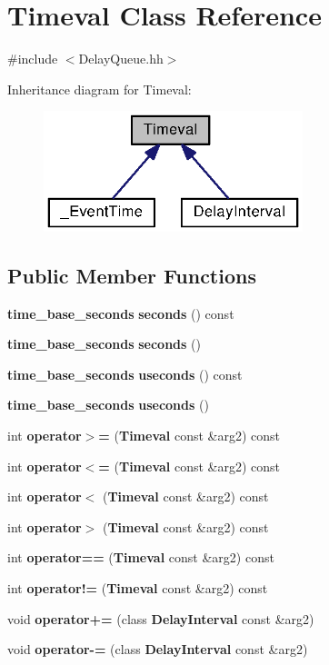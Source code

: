 \section{Timeval Class Reference}
\label{classTimeval}


{\ttfamily \#include $<$Delay\+Queue.\+hh$>$}



Inheritance diagram for Timeval\+:
\nopagebreak
\begin{figure}[H]
\begin{center}
\leavevmode
\includegraphics[width=214pt]{classTimeval__inherit__graph}
\end{center}
\end{figure}
\subsection*{Public Member Functions}
\begin{DoxyCompactItemize}
\item 
{\bf time\+\_\+base\+\_\+seconds} {\bf seconds} () const 
\item 
{\bf time\+\_\+base\+\_\+seconds} {\bf seconds} ()
\item 
{\bf time\+\_\+base\+\_\+seconds} {\bf useconds} () const 
\item 
{\bf time\+\_\+base\+\_\+seconds} {\bf useconds} ()
\item 
int {\bf operator$>$=} ({\bf Timeval} const \&arg2) const 
\item 
int {\bf operator$<$=} ({\bf Timeval} const \&arg2) const 
\item 
int {\bf operator$<$} ({\bf Timeval} const \&arg2) const 
\item 
int {\bf operator$>$} ({\bf Timeval} const \&arg2) const 
\item 
int {\bf operator==} ({\bf Timeval} const \&arg2) const 
\item 
int {\bf operator!=} ({\bf Timeval} const \&arg2) const 
\item 
void {\bf operator+=} (class {\bf Delay\+Interval} const \&arg2)
\item 
void {\bf operator-\/=} (class {\bf Delay\+Interval} const \&arg2)
\end{DoxyCompactItemize}
